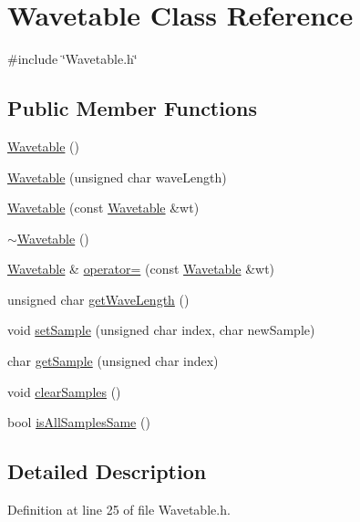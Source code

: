 \hypertarget{class_wavetable}{}\section{Wavetable Class Reference}
\label{class_wavetable}


{\ttfamily \#include \char`\"{}Wavetable.\+h\char`\"{}}

\subsection*{Public Member Functions}
\begin{DoxyCompactItemize}
\item 
\hyperlink{class_wavetable_a8dd3b6ebfc62270237f53cab076ded22}{Wavetable} ()
\item 
\hyperlink{class_wavetable_a4b95309638a0ba90cf170e8e0b8fa453}{Wavetable} (unsigned char wave\+Length)
\item 
\hyperlink{class_wavetable_ad0d61af03ebf9df4989971ed42245d8f}{Wavetable} (const \hyperlink{class_wavetable}{Wavetable} \&wt)
\item 
\hyperlink{class_wavetable_abcb5f277ac5644c679f9b77b0786d813}{$\sim$\+Wavetable} ()
\item 
\hyperlink{class_wavetable}{Wavetable} \& \hyperlink{class_wavetable_ad54063d548eeb7b1fad18543d4ff15c1}{operator=} (const \hyperlink{class_wavetable}{Wavetable} \&wt)
\item 
unsigned char \hyperlink{class_wavetable_ac7f597021cdace95c4e1e4c88fc36d2a}{get\+Wave\+Length} ()
\item 
void \hyperlink{class_wavetable_a01485340698b4bf92f3065f31feaf4c4}{set\+Sample} (unsigned char index, char new\+Sample)
\item 
char \hyperlink{class_wavetable_a2ed27fd46eac11bd828c7111fca7bc0b}{get\+Sample} (unsigned char index)
\item 
void \hyperlink{class_wavetable_ae4815729b57d8625a17ae0421b394217}{clear\+Samples} ()
\item 
bool \hyperlink{class_wavetable_aeb61e3ae23fc19d5578c5893323b0490}{is\+All\+Samples\+Same} ()
\end{DoxyCompactItemize}


\subsection{Detailed Description}


Definition at line 25 of file Wavetable.\+h.



